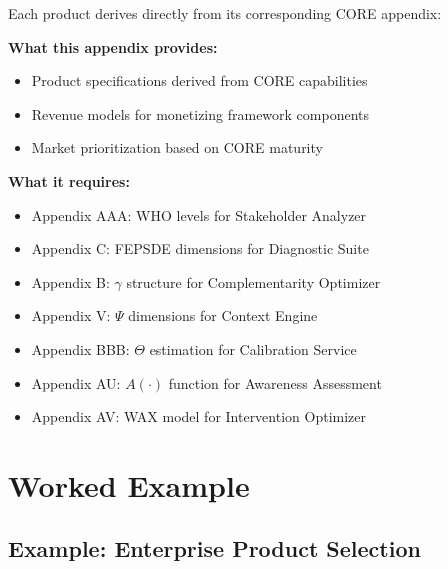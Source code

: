 Each product derives directly from its corresponding CORE appendix:

\begin{tcolorbox}[colback=yellow!5!white, colframe=yellow!75!black,
    title=Integration: VVV.3 $\leftrightarrow$ 9C CORE Appendices]
\textbf{What this appendix provides:}
\begin{itemize}[nosep]
\item Product specifications derived from CORE capabilities
\item Revenue models for monetizing framework components
\item Market prioritization based on CORE maturity
\end{itemize}

\textbf{What it requires:}
\begin{itemize}[nosep]
\item Appendix AAA: WHO levels for Stakeholder Analyzer
\item Appendix C: FEPSDE dimensions for Diagnostic Suite
\item Appendix B: $\gamma$ structure for Complementarity Optimizer
\item Appendix V: $\Psi$ dimensions for Context Engine
\item Appendix BBB: $\Theta$ estimation for Calibration Service
\item Appendix AU: $A(\cdot)$ function for Awareness Assessment
\item Appendix AV: WAX model for Intervention Optimizer
\end{itemize}
\end{tcolorbox}



\section{Worked Example}
\label{sec:vvv3-example}

\subsection{Example: Enterprise Product Selection}

